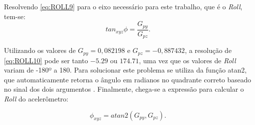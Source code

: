     
    Resolvendo \ref{eq:ROLL9} para o eixo necessário para este trabalho, que é o \textit{Roll}, tem-se:
    \begin{equation}
        tan_{xyz} \phi =  \frac{G_{py}}{G_{pz}}
        .
        \label{eq:ROLL10}
    \end{equation}
    
    Utilizando os valores de $G_{py} = 0,082198$ e $G_{pz} = -0,887432$, a resolução de \ref{eq:ROLL10} pode ser tanto $-5.29$ ou $174.71$, uma vez que os valores de \textit{Roll} variam de -180º a 180. Para solucionar este problema se utiliza da função atan2, que automaticamente retorna o ângulo em radianos no quadrante correto baseado no sinal dos dois argumentos \cite{nxp:acell}. Finalmente, chega-se a expressão para calcular o \textit{Roll} do acelerômetro:

    \begin{equation}
        \phi_{xyz} = atan2(G_{py}, G_{pz}).
        \label{eq:ROLL11}
    \end{equation}
